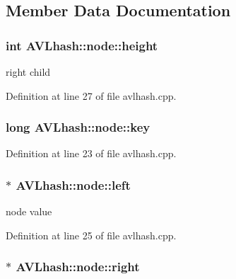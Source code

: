 \subsection{Member Data Documentation}
\hypertarget{class_a_v_lhash_1_1node_a5f11a2a4597ccc27db767b939e487f0a}{
\subsubsection[{height}]{\setlength{\rightskip}{0pt plus 5cm}int A\-V\-Lhash\-::node\-::height}}\label{class_a_v_lhash_1_1node_a5f11a2a4597ccc27db767b939e487f0a}


right child 



Definition at line 27 of file avlhash.\-cpp.

\hypertarget{class_a_v_lhash_1_1node_a17bc7500e27536b9104f1a90c1667fbd}{
\subsubsection[{key}]{\setlength{\rightskip}{0pt plus 5cm}long A\-V\-Lhash\-::node\-::key}}\label{class_a_v_lhash_1_1node_a17bc7500e27536b9104f1a90c1667fbd}


Definition at line 23 of file avlhash.\-cpp.

\hypertarget{class_a_v_lhash_1_1node_a55e3b2e9d0542812dfd00071b797ed99}{
\subsubsection[{left}]{$\ast$ A\-V\-Lhash\-::node\-::left}}\label{class_a_v_lhash_1_1node_a55e3b2e9d0542812dfd00071b797ed99}


node value 



Definition at line 25 of file avlhash.\-cpp.

\hypertarget{class_a_v_lhash_1_1node_a719f17a801bc3a229cda943611df8821}{
\subsubsection[{right}]{$\ast$ A\-V\-Lhash\-::node\-::right}}\label{class_a_v_lhash_1_1node_a719f17a801bc3a229cda943611df8821}


